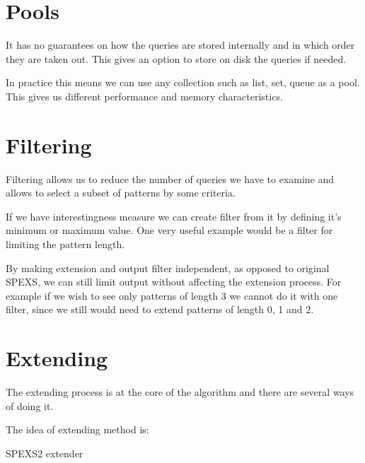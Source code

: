 \section{Pools}


It has no guarantees on how the queries are stored internally and in which order they are taken out. This gives an option to store on disk the queries if needed.

In practice this means we can use any collection such as list, set, queue as a pool. This gives us different performance and memory characteristics.

\section{Filtering}

Filtering allows us to reduce the number of queries we have to examine and allows to select a subset of patterns by some criteria. \eg

If we have interestingness measure we can create filter from it by defining it's minimum or maximum value. One very useful example would be a filter for limiting the pattern length. \eg

By making extension and output filter independent, as opposed to original SPEXS, we can still limit output without affecting the extension process. For example if we wish to see only patterns of length 3 we cannot do it with one filter, since we still would need to extend patterns of length 0, 1 and 2.

\section{Extending}

The extending process is at the core of the algorithm and there are several ways of doing it.



The idea of extending method is:

\begin{algorithm}[H]
	\caption{SPEXS2 extender}
\begin{algorithmic}[1]
	
	\EndFor

		\EndIf
	\EndFor

	\EndFor
\end{algorithmic}
\end{algorithm}

